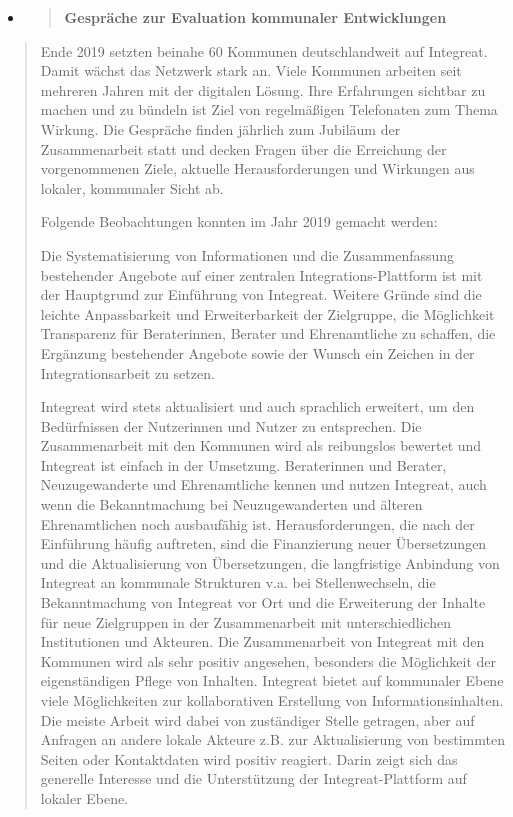 \documentclass[12pt, a4paper]{article} %
\begin{document}
\begin{itemize}
\item
  \begin{quote}
  \textbf{Gespräche zur Evaluation kommunaler Entwicklungen}
  \end{quote}
\end{itemize}

\begin{quote}
Ende 2019 setzten beinahe 60 Kommunen deutschlandweit auf Integreat.
Damit wächst das Netzwerk stark an. Viele Kommunen arbeiten seit
mehreren Jahren mit der digitalen Lösung. Ihre Erfahrungen sichtbar zu
machen und zu bündeln ist Ziel von regelmäßigen Telefonaten zum Thema
Wirkung. Die Gespräche finden jährlich zum Jubiläum der Zusammenarbeit
statt und decken Fragen über die Erreichung der vorgenommenen Ziele,
aktuelle Herausforderungen und Wirkungen aus lokaler, kommunaler Sicht
ab.

Folgende Beobachtungen konnten im Jahr 2019 gemacht werden:

Die Systematisierung von Informationen und die Zusammenfassung
bestehender Angebote auf einer zentralen Integrations-Plattform ist mit
der Hauptgrund zur Einführung von Integreat. Weitere Gründe sind die
leichte Anpassbarkeit und Erweiterbarkeit der Zielgruppe, die
Möglichkeit Transparenz für Beraterinnen, Berater und Ehrenamtliche zu
schaffen, die Ergänzung bestehender Angebote sowie der Wunsch ein
Zeichen in der Integrationsarbeit zu setzen.

Integreat wird stets aktualisiert und auch sprachlich erweitert, um den
Bedürfnissen der Nutzerinnen und Nutzer zu entsprechen. Die
Zusammenarbeit mit den Kommunen wird als reibungslos bewertet und
Integreat ist einfach in der Umsetzung. Beraterinnen und Berater,
Neuzugewanderte und Ehrenamtliche kennen und nutzen Integreat, auch wenn
die Bekanntmachung bei Neuzugewanderten und älteren Ehrenamtlichen noch
ausbaufähig ist. Herausforderungen, die nach der Einführung häufig
auftreten, sind die Finanzierung neuer Übersetzungen und die
Aktualisierung von Übersetzungen, die langfristige Anbindung von
Integreat an kommunale Strukturen v.a. bei Stellenwechseln, die
Bekanntmachung von Integreat vor Ort und die Erweiterung der Inhalte für
neue Zielgruppen in der Zusammenarbeit mit unterschiedlichen
Institutionen und Akteuren. Die Zusammenarbeit von Integreat mit den
Kommunen wird als sehr positiv angesehen, besonders die Möglichkeit der
eigenständigen Pflege von Inhalten. Integreat bietet auf kommunaler
Ebene viele Möglichkeiten zur kollaborativen Erstellung von
Informationsinhalten. Die meiste Arbeit wird dabei von zuständiger
Stelle getragen, aber auf Anfragen an andere lokale Akteure z.B. zur
Aktualisierung von bestimmten Seiten oder Kontaktdaten wird positiv
reagiert. Darin zeigt sich das generelle Interesse und die Unterstützung
der Integreat-Plattform auf lokaler Ebene.
\end{quote}
\end{document}
